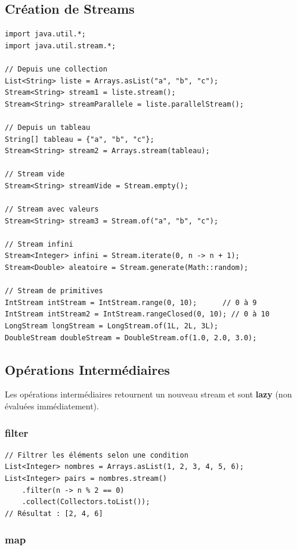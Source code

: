 \documentclass[11pt,a4paper]{article}
\begin{document}
\subsection{Création de Streams}

\begin{lstlisting}
import java.util.*;
import java.util.stream.*;

// Depuis une collection
List<String> liste = Arrays.asList("a", "b", "c");
Stream<String> stream1 = liste.stream();
Stream<String> streamParallele = liste.parallelStream();

// Depuis un tableau
String[] tableau = {"a", "b", "c"};
Stream<String> stream2 = Arrays.stream(tableau);

// Stream vide
Stream<String> streamVide = Stream.empty();

// Stream avec valeurs
Stream<String> stream3 = Stream.of("a", "b", "c");

// Stream infini
Stream<Integer> infini = Stream.iterate(0, n -> n + 1);
Stream<Double> aleatoire = Stream.generate(Math::random);

// Stream de primitives
IntStream intStream = IntStream.range(0, 10);      // 0 à 9
IntStream intStream2 = IntStream.rangeClosed(0, 10); // 0 à 10
LongStream longStream = LongStream.of(1L, 2L, 3L);
DoubleStream doubleStream = DoubleStream.of(1.0, 2.0, 3.0);
\end{lstlisting}

\subsection{Opérations Intermédiaires}

Les opérations intermédiaires retournent un nouveau stream et sont \textbf{lazy} (non évaluées immédiatement).

\subsubsection{filter}

\begin{lstlisting}
// Filtrer les éléments selon une condition
List<Integer> nombres = Arrays.asList(1, 2, 3, 4, 5, 6);
List<Integer> pairs = nombres.stream()
    .filter(n -> n % 2 == 0)
    .collect(Collectors.toList());
// Résultat : [2, 4, 6]
\end{lstlisting}

\subsubsection{map}
\end{document}
